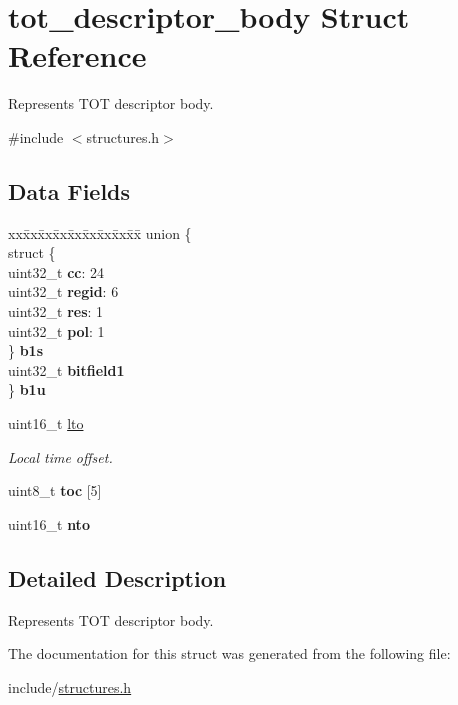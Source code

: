 \hypertarget{structtot__descriptor__body}{}\section{tot\+\_\+descriptor\+\_\+body Struct Reference}
\label{structtot__descriptor__body}


Represents T\+OT descriptor body.  




{\ttfamily \#include $<$structures.\+h$>$}

\subsection*{Data Fields}
\begin{DoxyCompactItemize}
\item 
\begin{tabbing}
xx\=xx\=xx\=xx\=xx\=xx\=xx\=xx\=xx\=\kill
union \{\\
\>struct \{\\
\>\>uint32\_t {\bfseries cc}: 24\\
\>\>uint32\_t {\bfseries regid}: 6\\
\>\>uint32\_t {\bfseries res}: 1\\
\>\>uint32\_t {\bfseries pol}: 1\\
\>\} {\bfseries b1s}\\
\>uint32\_t {\bfseries bitfield1}\\
\} {\bfseries b1u}\hypertarget{structtot__descriptor__body_af012c6228f1ff6630924e30b42faee13}{}\label{structtot__descriptor__body_af012c6228f1ff6630924e30b42faee13}
\\

\end{tabbing}\item 
uint16\+\_\+t \hyperlink{structtot__descriptor__body_af4dea234c9a3379b34d35824ae3bbce9}{lto}\hypertarget{structtot__descriptor__body_af4dea234c9a3379b34d35824ae3bbce9}{}\label{structtot__descriptor__body_af4dea234c9a3379b34d35824ae3bbce9}

\begin{DoxyCompactList}\small\item\em Local time offset. \end{DoxyCompactList}\item 
uint8\+\_\+t {\bfseries toc} \mbox{[}5\mbox{]}\hypertarget{structtot__descriptor__body_a8c2ccc7a68537e436b0f0d7b42317e0c}{}\label{structtot__descriptor__body_a8c2ccc7a68537e436b0f0d7b42317e0c}

\item 
uint16\+\_\+t {\bfseries nto}\hypertarget{structtot__descriptor__body_a670883199a91d2c5898d16408da0badb}{}\label{structtot__descriptor__body_a670883199a91d2c5898d16408da0badb}

\end{DoxyCompactItemize}


\subsection{Detailed Description}
Represents T\+OT descriptor body. 

The documentation for this struct was generated from the following file\+:\begin{DoxyCompactItemize}
\item 
include/\hyperlink{structures_8h}{structures.\+h}\end{DoxyCompactItemize}
